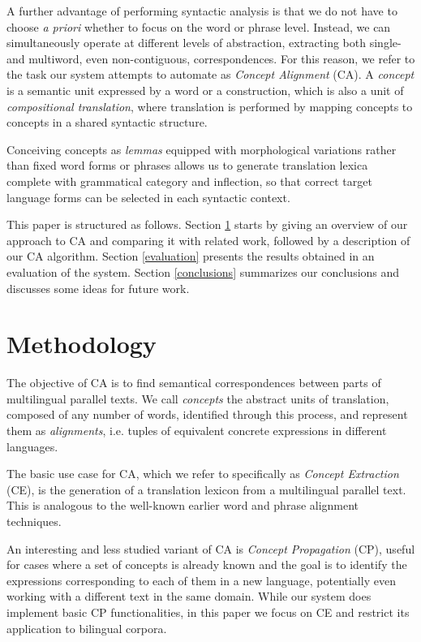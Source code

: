 \documentclass[11pt]{article}
\begin{document}
A further advantage of performing syntactic analysis is that we do not have to choose \textit{a priori} whether to focus on the word or phrase level. 
Instead, we can simultaneously operate at different levels of abstraction, extracting both single- and multiword, even non-contiguous, correspondences. 
For this reason, we refer to the task our system attempts to automate as \textit{Concept Alignment} (CA). 
A \textit{concept} is a semantic unit expressed by a word or a construction, which is also a unit of \textit{compositional translation}, where translation is performed by mapping concepts to concepts in a shared syntactic structure.

Conceiving concepts as \textit{lemmas} equipped with morphological variations rather than fixed word forms or phrases allows us to generate translation lexica complete with grammatical category and inflection, so that correct target language forms can be selected in each syntactic context.

This paper is structured as follows. 
Section \ref{methodology} starts by giving an overview of our approach to CA and comparing it with related work, followed by a description of our CA algorithm.
Section \ref{evaluation} presents the results obtained in an evaluation of the system.
Section \ref{conclusions} summarizes our conclusions and discusses some ideas for future work. 

\section{Methodology} \label{methodology}
The objective of CA is to find semantical correspondences between parts of multilingual parallel texts. 
We call \textit{concepts} the abstract units of translation, composed of any number of words, identified through this process, and represent them as \textit{alignments}, i.e. tuples of equivalent concrete expressions in different languages.

The basic use case for CA, which we refer to specifically as \textit{Concept Extraction} (CE), is the generation of a translation lexicon from a multilingual parallel text.
This is analogous to the well-known earlier word and phrase alignment techniques. 

An interesting and less studied variant of CA is \textit{Concept Propagation} (CP), useful for cases where a set of concepts is already known and the goal is to identify the expressions corresponding to each of them in a new language, potentially even working with a different text in the same domain.
While our system does implement basic CP functionalities, in this paper we focus on CE and restrict its application to bilingual corpora. 
\end{document}
